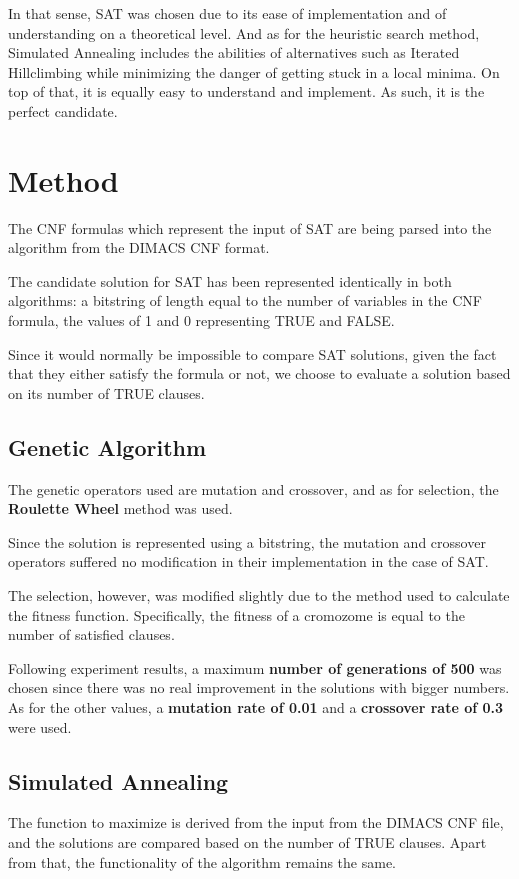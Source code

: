 \documentclass{article}
\begin{document}
In that sense, SAT was chosen due to its ease of implementation and of
understanding on a theoretical level. And as for the heuristic search method,
Simulated Annealing includes the abilities of alternatives such as Iterated
Hillclimbing while minimizing the danger of getting stuck in a local minima.
On top of that, it is equally easy to understand and implement. As such, it
is the perfect candidate. 


\section{Method}
The CNF formulas which represent the input of SAT are being parsed into
the algorithm from the DIMACS CNF format. \cite{dimacs}

The candidate solution for SAT has been represented identically in both
algorithms: a bitstring of length equal to the number of variables in the CNF
formula, the values of 1 and 0 representing TRUE and FALSE.

Since it would normally be impossible to compare SAT solutions, given the
fact that they either satisfy the formula or not, we choose to evaluate a 
solution based on its number of TRUE clauses.

\subsection{Genetic Algorithm}
The genetic operators used are mutation and crossover, and as for selection,
the \textbf{Roulette Wheel} method was used.

Since the solution is represented using a bitstring, the mutation and crossover
operators suffered no modification in their implementation in the case of SAT.

The selection, however, was modified slightly due to the method used to
calculate the fitness function. Specifically, the fitness of a cromozome
is equal to the number of satisfied clauses.

Following experiment results, a maximum \textbf{number of generations of 500} was chosen
since there was no real improvement in the solutions with bigger numbers.
As for the other values, a \textbf{mutation rate of 0.01} and a \textbf{crossover rate of 0.3}
were used.

\subsection{Simulated Annealing}
The function to maximize is derived from the input from the DIMACS CNF file,
and the solutions are compared based on the number of TRUE clauses. Apart
from that, the functionality of the algorithm remains the same.
\end{document}
